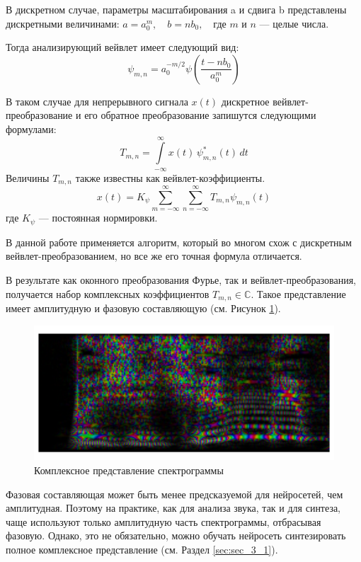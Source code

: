 В дискретном случае, параметры масштабирования a и сдвига b представлены дискретными величинами: $a=a_{0}^{m},\quad b=nb_{0},\quad$где $m$ и $n$ — целые числа.

Тогда анализирующий вейвлет имеет следующий вид:
\begin{equation}
  \psi _{m,n}=a_{0}^{-m/2}\psi \left({\frac {t-nb_{0}}{a_{0}^{m}}}\right)
\end{equation}

В таком случае для непрерывного сигнала $x(t)$ дискретное вейвлет-преобразование и его обратное преобразование запишутся следующими формулами:
\begin{equation}
  {\displaystyle T_{m,n}=\int \limits _{-\infty }^{\infty }x(t)\,\psi _{m,n}^{*}(t)\,dt}
\end{equation}
Величины $T_{m,n}$ также известны как вейвлет-коэффициенты.
\begin{equation}
  x(t)=K_{\psi }\sum \limits _{m=-\infty }^{\infty }\sum \limits _{n=-\infty }^{\infty }T_{m,n}\psi _{m,n}(t)
\end{equation}
где $K_{\psi }$ — постоянная нормировки.

В данной работе применяется алгоритм, который во многом схож с дискретным вейвлет-преобразованием, но все же его точная формула отличается.


В результате как оконного преобразования Фурье, так и вейвлет-преобразования, получается набор комплексных коэффициентов $T_{m,n} \in \mathbb{C}$. 
Такое представление имеет амплитудную и фазовую составляющую (см. Рисунок \ref{fig:complex_spec}). 

\begin{figure}
  \centering
  \includegraphics[width=0.9\linewidth]{figures/complex_spec}
  \caption{Комплексное представление спектрограммы}
  \label{fig:complex_spec}
\end{figure}

Фазовая составляющая может быть менее предсказуемой для нейросетей, чем амплитудная.
Поэтому на практике, как для анализа звука, так и для синтеза, чаще используют только амплитудную часть спектрограммы, отбрасывая фазовую.
Однако, это не обязательно, можно обучать нейросеть синтезировать полное комплексное представление (см. Раздел \ref{sec:sec_3_1}).


